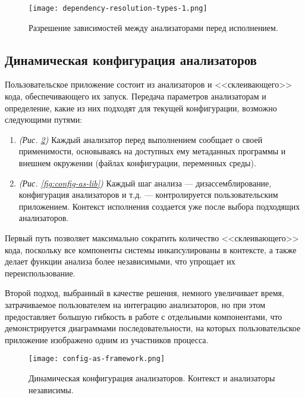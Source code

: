 \documentclass[listings]{labreport}
\begin{document}
\begin{figure}[H]
\centering
\texttt{[image: dependency-resolution-types-1.png]}
\caption{\small{Разрешение зависимостей между анализаторами перед исполнением.}}
\label{fig:deps-types}
\end{figure}

\newpage
\subsection*{Динамическая конфигурация анализаторов}

Пользовательское приложение состоит из анализаторов и <<склеивающего>> кода,
обеспечивающего их запуск. Передача параметров анализаторам и определение,
какие из них подходят для текущей конфигурации, возможно следующими путями:
\begin{enumerate}[noitemsep,topsep=0em]
\item \textit{(Рис. \ref{fig:config-as-fw})} Каждый анализатор перед выполнением
  сообщает о своей применимости, основываясь на доступных ему метаданных программы
  и внешнем окружении (файлах конфигурации, переменных среды).
\item \textit{(Рис. \ref{fig:config-as-lib})} Каждый шаг анализа — дизассемблирование,
  конфигурация анализаторов и т.д. — контролируется пользовательским приложением.
  Контекст исполнения создается уже после выбора подходящих анализаторов.
\end{enumerate}
\vspace{0.4em}

Первый путь позволяет максимально сократить количество <<склеивающего>> кода,
поскольку все компоненты системы инкапсулированы в контексте, а также делает
функции анализа более независимыми, что упрощает их переиспользование.

Второй подход, выбранный в качестве решения, немного увеличивает время,
затрачиваемое пользователем на интеграцию анализаторов, но при этом предоставляет
большую гибкость в работе с отдельными компонентами, что демонстрируется
диаграммами последовательности, на которых пользовательское приложение
изображено одним из участников процесса.

\begin{figure}[H]
\centering
\texttt{[image: config-as-framework.png]}
\caption{\small{Динамическая конфигурация анализаторов. Контекст и анализаторы независимы.}}
\label{fig:config-as-fw}
\end{figure}
\end{document}
